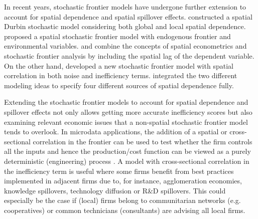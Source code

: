In recent years, stochastic frontier models have undergone further extension to account for spatial dependence and spatial spillover effects. \cite{glass2016spatial} constructed a spatial Durbin stochastic model considering both global and local spatial dependence. \cite{kutluSpatialStochasticFrontier2020} proposed a spatial stochastic frontier model with endogenous frontier and environmental variables. \cite{glass2016spatial} and \cite{kutluSpatialStochasticFrontier2020} combine the concepts of spatial econometrics and stochastic frontier analysis by including the spatial lag of the dependent variable. On the other hand, \cite{orea2019new} developed a new stochastic frontier model with spatial correlation in both noise and inefficiency terms. \cite{galli2022spatial} integrated the two different modeling ideas to specify four different sources of spatial dependence  fully. 


Extending the stochastic frontier models to account for spatial dependence and spillover effects not only allows getting more accurate inefficiency scores \citep{orea2018spatial} but also examining relevant economic issues that a non-spatial stochastic frontier model tends to overlook. In microdata applications, the addition of a spatial or cross-sectional correlation in the frontier can be used to test whether the firm controls all the inputs and hence the production/cost function can be viewed as a purely deterministic (engineering) process \citep{druska2004generalized}. A model with cross-sectional correlation in the inefficiency term is useful where some firms benefit from best practices implemented in adjacent firms due to, for instance, agglomeration economies, knowledge spillovers, technology diffusion or R\&D spillovers. This could especially be the case if (local) firms belong to communitarian networks (e.g. cooperatives) or common technicians (consultants) are advising all local firms. 


